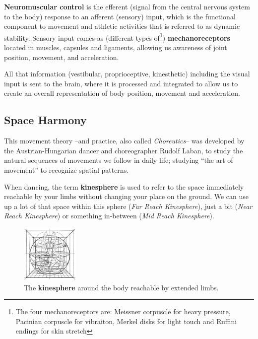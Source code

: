 \textbf{Neuromuscular control} is the efferent (signal from the central nervous system to the body) response to an afferent (sensory) input, which is the functional component to movement and athletic activities that is referred to as dynamic stability.
Sensory input comes as (different types of\footnote{The four mechanoreceptors are: Meissner corpuscle for heavy pressure, Pacinian corpuscle for vibraiton, Merkel disks for light touch and Ruffini endings for skin stretch}) \textbf{mechanoreceptors} located in muscles, capsules and ligaments, allowing us awareness of joint position, movement, and acceleration.

All that information (vestibular, proprioceptive, kinesthetic) including the visual input is sent to the brain, where it is processed and integrated to allow us to create an overall representation of body position, movement and acceleration.

\subsection{Space Harmony}\label{subsec:space-harmony}

This movement theory --and practice, also called \textit{Choreutics}-- was developed by the Austrian-Hungarian dancer and choreographer Rudolf Laban, to study the natural sequences of movements we follow in daily life; studying ``the art of movement'' to recognize spatial patterns.

When dancing, the term \textbf{\gls{kinesphere}} is used to refer to the space immediately reachable by your limbs without changing your place on the ground.
We can use up a lot of that space within this sphere (\textit{Far Reach Kinesphere}), just a bit (\textit{Near Reach Kinesphere}) or something in-between (\textit{Mid Reach Kinesphere}).

\begin{figure}
    \centering
    \includegraphics[width=0.25\textwidth]{images/kinsphere}
    \caption{The \textbf{kinesphere} around the body reachable by extended limbs.}
\end{figure}

